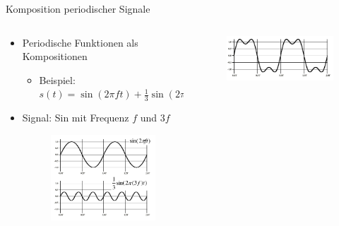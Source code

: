 \documentclass[xcolor=dvipsnames,aspectratio=169]{beamer}
\begin{document}
\begin{frame}{Komposition periodischer Signale}
\begin{columns}[T] %
\begin{column}{.6\textwidth}
\begin{itemize}
	\item Periodische Funktionen als Kompositionen
	\begin{itemize}
		\item Beispiel: $s(t) = \sin(2\pi f t) + \frac{1}{3} \sin(2\pi (3f) t)$
	\end{itemize}
	\item Signal: Sin mit Frequenz $f$ und $3f$
	\begin{figure}
	\centering
	\includegraphics[scale=0.3]{sin}
	\end{figure}
\end{itemize}
\end{column}%
\hfill%
\begin{column}{.4\textwidth}
\vspace*{.75cm}
\begin{figure}
\centering
\includegraphics[scale=0.4]{comp}
\end{figure}
\end{column}%
\end{columns}
\end{frame}
\end{document}
